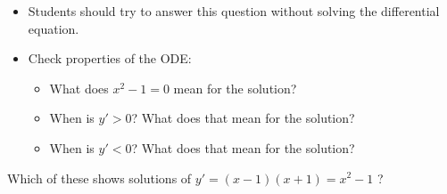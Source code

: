 
\begin{annotation}
\begin{goals}
	\begin{itemize}
		\item Students should try to answer this question without solving the differential equation.
		\item Check properties of the ODE:
		\begin{itemize}
			\item What does $x^2-1=0$ mean for the solution?
			\item When is $y'>0$? What does that mean for the solution?
			\item When is $y'<0$? What does that mean for the solution?
		\end{itemize}
	\end{itemize}
\end{goals}	
\end{annotation}

\question

Which of these shows solutions of $y' = (x-1)(x+1) = x^2 - 1$ ?

\newlength{\len}


\def\modeightA{
\begin{tikzpicture}[scale=0.65,yscale=0.8]
    \begin{scope}
	    \clip (-3,-3) rectangle (3,3);
		\foreach \k in {-9,-7, ..., 31} {
	      \draw[samples=50,domain=-3:3,variable=\x,color=gray!80!black] plot ({\x},{(\k-3*(\x*\x))/2});
	    }
    \end{scope}
    \draw[thick] (-3,-3) -- (-3,3);
    \draw[thick] (-3,-3) -- (3,-3);
    \foreach \k in {-3,-2, ..., 3} {
      \draw ({\k,-3}) node[below] {\tiny $\k$};
      \draw ({-3,\k}) node[left] {\tiny $\k$};
    }
\end{tikzpicture}
}

